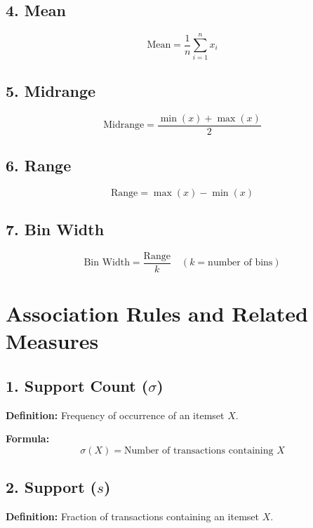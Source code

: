 \documentclass[a4paper,10pt]{article}
\begin{document}
\subsection*{4. Mean}

\[
\text{Mean} = \frac{1}{n}\sum_{i=1}^{n} x_i
\]

\vspace{0.5cm}

\subsection*{5. Midrange}

\[
\text{Midrange} = \frac{\min(x) + \max(x)}{2}
\]

\vspace{0.5cm}

\subsection*{6. Range}

\[
\text{Range} = \max(x) - \min(x)
\]

\vspace{0.5cm}

\subsection*{7. Bin Width}

\[
\text{Bin Width} = \frac{\text{Range}}{k} \quad (k = \text{number of bins})
\]

\newpage %

\section*{\centering Association Rules and Related Measures}

\subsection*{1. Support Count ($\sigma$)}
\textbf{Definition:} Frequency of occurrence of an itemset \(X\).

\textbf{Formula:}
\[
\sigma(X) = \text{Number of transactions containing } X
\]

\vspace{1cm}

\subsection*{2. Support ($s$)}
\textbf{Definition:} Fraction of transactions containing an itemset \(X\).
\end{document}

